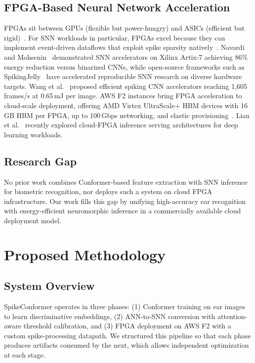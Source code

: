 \documentclass[11pt,a4paper]{article}
\begin{document}
\subsection{FPGA-Based Neural Network Acceleration}

FPGAs sit between GPUs (flexible but power-hungry) and ASICs (efficient but rigid)~\cite{abdelouahab2018accelerating, guo2019dl}. For SNN workloads in particular, FPGAs excel because they can implement event-driven dataflows that exploit spike sparsity natively~\cite{panchapakesan2022syncnn, liu2022fpga}. Navardi and Mohsenin~\cite{navardi2024energy} demonstrated SNN accelerators on Xilinx Artix-7 achieving 86\% energy reduction versus binarized CNNs, while open-source frameworks such as SpikingJelly~\cite{syntzulu2025} have accelerated reproducible SNN research on diverse hardware targets. Wang et al.~\cite{wang2025spiking} proposed efficient spiking CNN accelerators reaching 1,605 frames/s at 0.65\,mJ per image. AWS F2 instances bring FPGA acceleration to cloud-scale deployment, offering AMD Virtex UltraScale+ HBM devices with 16\,GB HBM per FPGA, up to 100\,Gbps networking, and elastic provisioning~\cite{aws2025f2}. Lian et al.~\cite{lian2024fpga} recently explored cloud-FPGA inference serving architectures for deep learning workloads.

\subsection{Research Gap}

No prior work combines Conformer-based feature extraction with SNN inference for biometric recognition, nor deploys such a system on cloud FPGA infrastructure. Our work fills this gap by unifying high-accuracy ear recognition with energy-efficient neuromorphic inference in a commercially available cloud deployment model.

\section{Proposed Methodology}\label{sec:method}

\subsection{System Overview}

SpikeConformer operates in three phases: (1) Conformer training on ear images to learn discriminative embeddings, (2) ANN-to-SNN conversion with attention-aware threshold calibration, and (3) FPGA deployment on AWS F2 with a custom spike-processing datapath. We structured this pipeline so that each phase produces artifacts consumed by the next, which allows independent optimization at each stage.
\end{document}
